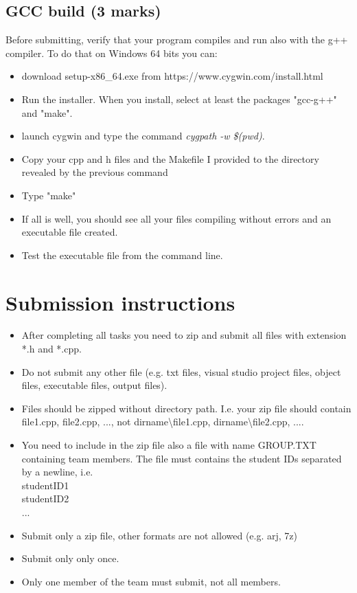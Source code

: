 \documentclass[10pt]{article}
\begin{document}
\subsection{GCC build (3 marks)}
Before submitting, verify that your program compiles and run also with the g++ compiler. To do that on Windows 64 bits you can:
\begin{itemize}
    \item download setup-x86\_64.exe from https://www.cygwin.com/install.html
    \item Run the installer. When you install, select at least the packages "gcc-g++" and "make".
    \item launch cygwin and type the command \textit{cygpath -w \$(pwd)}.
    \item Copy your cpp and h files and the Makefile I provided to the directory revealed by the previous command
    \item Type "make"
    \item If all is well, you should see all your files compiling without errors and an executable file created.
    \item Test the executable file from the command line.
\end{itemize}

\section{Submission instructions}
\label{sec:submission}
\begin{itemize}
    \item After completing all tasks you need to zip and submit all files with extension *.h and *.cpp.
    \item Do not submit any other file (e.g. txt files, visual studio project files, object files, executable files, output files).
    \item Files should be zipped without directory path.  I.e. your zip file should contain file1.cpp, file2.cpp, ..., not dirname\textbackslash file1.cpp, dirname\textbackslash file2.cpp, ....
    \item You need to include in the zip file also a file with name GROUP.TXT containing team members. The file must contains the student IDs separated by a newline, i.e.
    \\ \indent studentID1
    \\ \indent  studentID2
    \\ \indent  ...
    \item Submit only a zip file, other formats are not allowed (e.g. arj, 7z)
    \item Submit only only once.
    \item Only one member of the team must submit, not all members.
\end{itemize}
  
\end{document}
